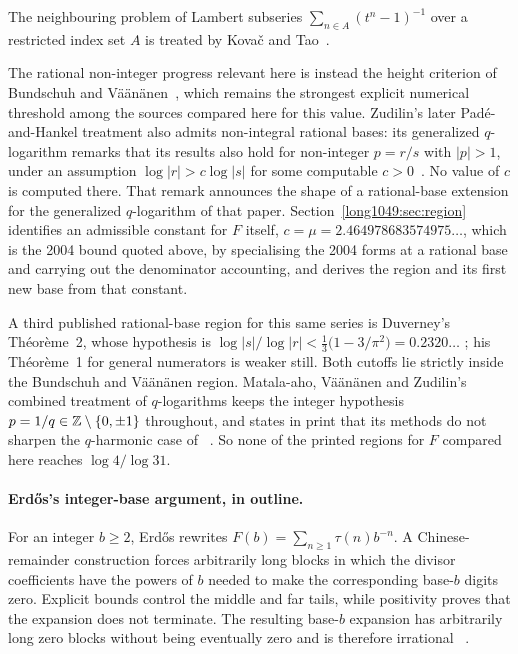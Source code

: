 \documentclass[11pt]{article}
\begin{document}
The neighbouring problem of Lambert
subseries $\sum_{n\in A}(t^{n}-1)^{-1}$ over a restricted index set $A$ is
treated by Kova\v{c} and Tao~\cite{kovactao2024}.

The rational non-integer
progress relevant here is instead the height criterion of Bundschuh and
V\"a\"an\"anen~\cite{bv1994}, which remains the strongest explicit numerical
threshold among the sources compared here for this value.  Zudilin's later
Pad\'e-and-Hankel treatment also admits non-integral rational bases: its
generalized $q$-logarithm remarks that its results also hold for non-integer
$p=r/s$ with $|p|>1$, under an assumption $\log|r|>c\log|s|$ for some computable
$c>0$~\cite{zudilin2016}.  No value of $c$ is computed there.  That remark
announces the shape of a rational-base extension for the generalized
$q$-logarithm of that paper.  Section~\ref{long1049:sec:region} identifies an admissible
constant for $F$ itself, $c=\mu=2.464978683574975\ldots$, which is the 2004
bound quoted above, by specialising the 2004 forms at a rational base and
carrying out the denominator accounting, and derives the region and its first
new base from that constant.

A third published rational-base region for this same series is Duverney's
Th\'eor\`eme~2, whose hypothesis is
$\log|s|/\log|r|<\frac13\bigl(1-3/\pi^{2}\bigr)=0.2320\ldots$
\cite[Th\'eor\`eme~2, p.~174]{duverney1996}; his Th\'eor\`eme~1 for general
numerators is weaker still.  Both cutoffs lie strictly inside the Bundschuh and
V\"a\"an\"anen region.  Matala-aho, V\"a\"an\"anen and Zudilin's combined
treatment of $q$-logarithms keeps the integer hypothesis $p=1/q\in\mathbb{Z}\mathbin{\backslash}\{0,\pm1\}$
throughout, and states in print that its methods do not sharpen the
$q$-harmonic case of~\cite{zudilin2004}
\cite[abstract p.~879; introduction p.~880]{matalaaho2006}.  So none of the
printed regions for $F$ compared here reaches $\log4/\log31$.

\paragraph{Erd\H{o}s's integer-base argument, in outline.}
For an integer $b\ge2$, Erd\H{o}s rewrites
$F(b)=\sum_{n\ge1}\tau(n)b^{-n}$.  A Chinese-remainder construction forces
arbitrarily long blocks in which the divisor coefficients have the powers of
$b$ needed to make the corresponding base-$b$ digits zero.  Explicit bounds
control the middle and far tails, while positivity proves that the expansion
does not terminate.  The resulting base-$b$ expansion has arbitrarily long
zero blocks without being eventually zero and is therefore irrational
~\cite[pp.~63--66]{erdos1948}.
\end{document}
